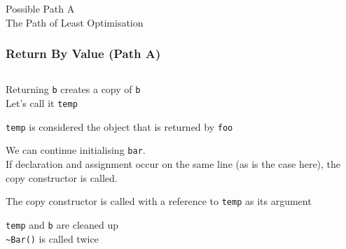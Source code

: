 \begin{frame}
  \begin{center} \Huge
    Possible Path A \\[4mm]
    The Path of Least Optimisation
  \end{center}
\end{frame}

\begin{frame}
  \frametitle{Return By Value (Path A)}
  \begin{center}
    \begin{columns}
      \column{4cm}
      \column{4cm}
    \end{columns}
  \end{center}
  \vskip2mm
  \begin{overprint}
    \begin{center}
      Returning {\tt b} creates a copy of {\tt b} \\
      Let's call it {\tt temp} \\
    \end{center}

    \begin{center}
      {\tt temp} is considered the object that is returned by {\tt foo}
    \end{center}

    \begin{center}
      We can continue initialising {\tt bar}. \\
      If declaration and assignment occur on the same line (as is the case here),
      the copy constructor is called.
    \end{center}

    \begin{center}
      The copy constructor is called with a reference to {\tt temp} as its argument
    \end{center}

    \begin{center}
      {\tt temp} and {\tt b} are cleaned up \\
      {\tt \~{}Bar()} is called twice
    \end{center}
  \end{overprint}
\end{frame}

